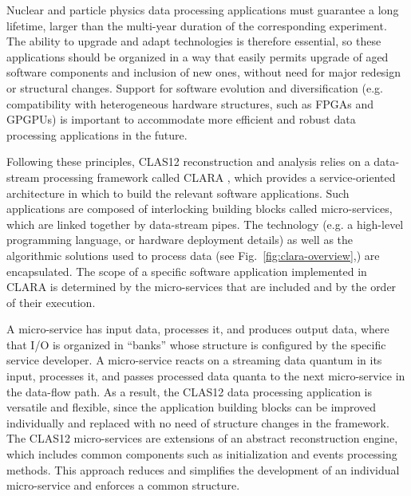 Nuclear and particle physics data processing applications must guarantee a long lifetime, larger than the multi-year duration of the corresponding experiment. The ability to upgrade and adapt technologies is therefore essential, so these applications should be organized in a way that easily permits upgrade of aged software components and inclusion of new ones, without need for major redesign or structural changes.  Support for software evolution and diversification (e.g. compatibility with heterogeneous hardware structures, such as FPGAs and GPGPUs) is important to accommodate more efficient and robust data processing applications in the future.


Following these principles, CLAS12 reconstruction and analysis relies on a data-stream processing framework called CLARA \cite{clara-2011,clara-service,framework,clara-2016}, which provides a service-oriented architecture in which to build the relevant software applications.  Such applications are composed of interlocking building blocks called micro-services, which are linked together by data-stream pipes.  The technology (e.g. a high-level programming language, or hardware deployment details) as well as the algorithmic solutions used to process data (see Fig.~\ref{fig:clara-overview},) are encapsulated.
The scope of a specific software application implemented in CLARA is determined by the micro-services that are included and by the order of their execution.

A micro-service has input data, processes it, and produces output data, where that I/O is organized in ``banks'' whose structure is configured by the specific service developer.  A micro-service reacts on a streaming data quantum in its input, processes it, and passes processed data quanta to the next micro-service in the data-flow path.  As a result, the CLAS12 data processing application is versatile and flexible, since the application building blocks can be improved individually and replaced with no need of structure changes in the framework. The CLAS12 micro-services are extensions of an abstract reconstruction engine, which includes common components such as initialization and events processing methods. This approach reduces and simplifies the development of an individual micro-service and enforces a common structure. 


